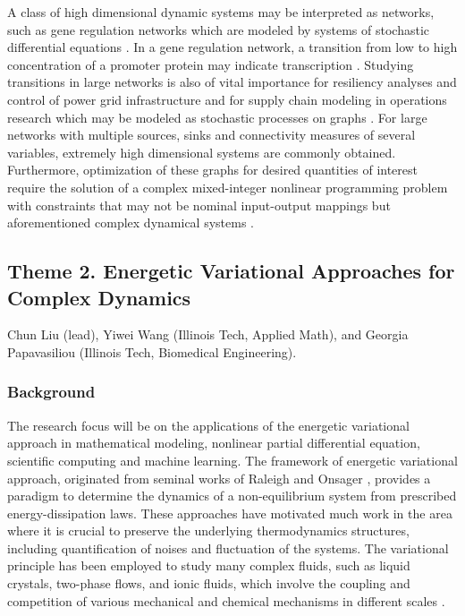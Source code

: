 \documentclass[11pt]{NSFamsart}
\begin{document}
A class of high dimensional dynamic systems may be interpreted as networks, such as   gene regulation networks \cite{Raser2005} which are modeled by systems of stochastic differential equations \cite{Suel06}.  In a gene regulation network, a transition from low to high concentration of a promoter protein may indicate transcription \cite{Stefan,ZLDK}. Studying transitions in large networks is also of vital importance for resiliency analyses and control of power grid infrastructure and for supply chain modeling in operations research which may be modeled as stochastic processes on graphs \cite{shin2020graph,anghel2007stochastic,nardelli2014models}. For large networks with multiple sources, sinks and connectivity measures of several variables, extremely high dimensional systems are commonly obtained. Furthermore, optimization of these graphs for desired quantities of interest require the solution of a complex mixed-integer nonlinear programming problem with constraints that may not be nominal input-output mappings but aforementioned complex dynamical systems \cite{shin2020decentralized,sampat2017optimization,kim2019graph,shin2021exponential}.


\subsection*{Theme 2. Energetic Variational Approaches for Complex Dynamics}
Chun Liu (lead), Yiwei Wang (Illinois Tech, Applied Math), and Georgia Papavasiliou (Illinois Tech, Biomedical Engineering).

\subsubsection*{Background} The research focus will be on the applications of the energetic variational approach in mathematical modeling, nonlinear partial differential equation, scientific computing and machine learning. The framework of energetic variational approach, originated from seminal works of Raleigh \cite{strutt1871some} and Onsager \cite{onsager1931reciprocal,onsager1931reciprocal2}, provides a paradigm to determine the dynamics of a non-equilibrium system from prescribed energy-dissipation laws.
These approaches have motivated much work in the area where it is crucial to preserve the underlying
thermodynamics structures, including quantification of noises and fluctuation of the systems.
The variational principle has been employed to study many complex fluids, such as liquid crystals, two-phase flows, and ionic fluids, which involve the coupling and competition of various mechanical and chemical mechanisms in different scales \cite{lin2001static, feng2005energetic, LiLiZh05, Lin2007, liu2009introduction, du2009energetic, sun2009energetic, eisenberg2010energy, Giga2017, Liu2019, knopf2020phase}.
\end{document}
